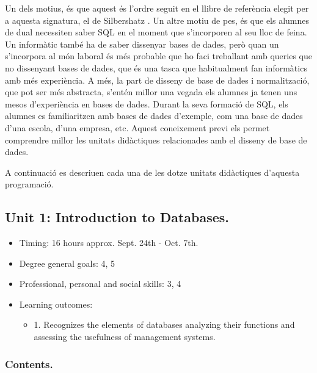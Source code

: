 \documentclass[catalan, a4paper, 12pt, titlepage]{article}
\begin{document}
Un dels motius, és que aquest és l'ordre seguit en el llibre de referència elegit per a aquesta signatura, el de Silbershatz \cite{silbershatz2020}.
Un altre motiu de pes, és que els alumnes de dual necessiten saber SQL en el moment que s'incorporen al seu lloc de feina.
Un informàtic també ha de saber dissenyar bases de dades, però quan un s'incorpora al món laboral és més probable que ho faci treballant amb queries que no dissenyant bases de dades, que és una tasca que habitualment fan informàtics amb més experiència.
A més, la part de disseny de base de dades i normalització, que pot ser més abstracta, s'entén millor una vegada els alumnes ja tenen uns mesos d'experiència en bases de dades.
Durant la seva formació de SQL, els alumnes es familiaritzen amb bases de dades d'exemple, com una base de dades d'una escola, d'una empresa, etc.
Aquest coneixement previ els permet comprendre millor les unitats didàctiques relacionades amb el disseny de base de dades.

A continuació es descriuen cada una de les dotze unitats didàctiques d'aquesta programació.

  \subsection{Unit 1: Introduction to Databases.}

  \begin{itemize}
	\item Timing: 16 hours approx. Sept. 24th - Oct. 7th.
	\item Degree general goals: 4, 5
	\item Professional, personal and social skills: 3, 4
	\item Learning outcomes: 
		\begin{itemize}
			\item 1. Recognizes the elements of databases analyzing their functions and assessing the usefulness of management systems.
		\end{itemize}
  \end{itemize}

  
  \subsubsection{Contents.}
\end{document}

